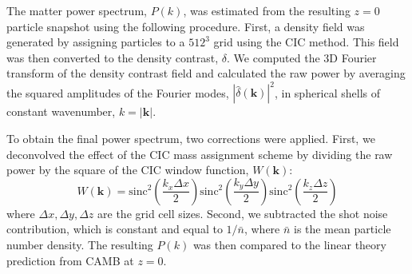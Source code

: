 \documentclass[]{article}
\begin{document}
The matter power spectrum, $P(k)$, was estimated from the resulting $z=0$ particle snapshot using the following procedure. First, a density field was generated by assigning particles to a $512^3$ grid using the CIC method. This field was then converted to the density contrast, $\delta$. We computed the 3D Fourier transform of the density contrast field and calculated the raw power by averaging the squared amplitudes of the Fourier modes, $|\hat{\delta}(\mathbf{k})|^2$, in spherical shells of constant wavenumber, $k = |\mathbf{k}|$.

To obtain the final power spectrum, two corrections were applied. First, we deconvolved the effect of the CIC mass assignment scheme by dividing the raw power by the square of the CIC window function, $W(\mathbf{k})$:
\begin{equation}
    W(\mathbf{k}) = \text{sinc}^2\left(\frac{k_x \Delta x}{2}\right) \text{sinc}^2\left(\frac{k_y \Delta y}{2}\right) \text{sinc}^2\left(\frac{k_z \Delta z}{2}\right)
\end{equation}
where $\Delta x, \Delta y, \Delta z$ are the grid cell sizes. Second, we subtracted the shot noise contribution, which is constant and equal to $1/\bar{n}$, where $\bar{n}$ is the mean particle number density. The resulting $P(k)$ was then compared to the linear theory prediction from CAMB at $z=0$.
\end{document}
